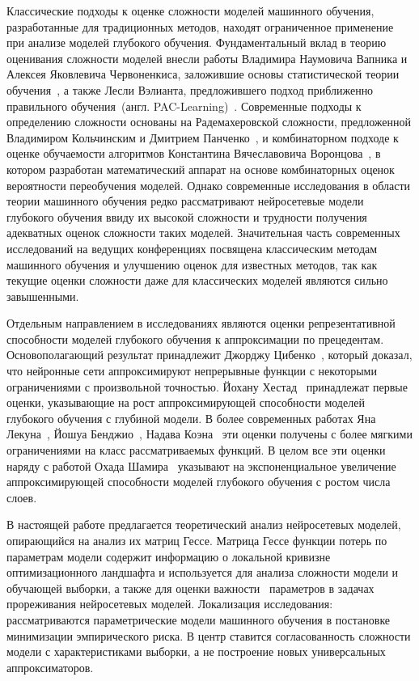 Классические подходы к оценке сложности моделей машинного обучения, разработанные для традиционных методов, находят ограниченное применение при анализе моделей глубокого обучения.
Фундаментальный вклад в теорию оценивания сложности моделей внесли работы Владимира Наумовича Вапника и Алексея Яковлевича Червоненкиса, заложившие основы статистической теории обучения~\cite{vapnik1974StatTheory}, а также Лесли Вэлианта, предложившего подход приближенно правильного обучения~(англ. PAC-Learning)~\cite{valiant1984LearnableTheory}.
Современные подходы к определению сложности основаны на Радемахеровской сложности, предложенной Владимиром Кольчинским и Дмитрием Панченко~\cite{koltchinskii2000RadamakherTheory}, и комбинаторном подходе к оценке обучаемости алгоритмов Константина Вячеславовича Воронцова~\cite{vorontsov04qualdan}, в котором разработан математический аппарат на основе комбинаторных оценок вероятности переобучения моделей.
Однако современные исследования в области теории машинного обучения редко рассматривают нейросетевые модели глубокого обучения ввиду их высокой сложности и трудности получения адекватных оценок сложности таких моделей.
Значительная часть современных исследований на ведущих конференциях посвящена классическим методам машинного обучения и улучшению оценок для известных методов, так как текущие оценки сложности даже для классических моделей являются сильно завышенными.

Отдельным направлением в исследованиях являются оценки репрезентативной способности моделей глубокого обучения к аппроксимации по прецедентам.
Основополагающий результат принадлежит Джорджу Цибенко~\cite{cybenko1989ApproximationBS}, который доказал, что нейронные сети аппроксимируют непрерывные функции с некоторыми ограничениями с произвольной точностью.
Йохану Хестад~\cite{hastad1987phd} принадлежат первые оценки, указывающие на рост аппроксимирующей способности моделей глубокого обучения с глубиной модели.
В более современных работах Яна Лекуна~\cite{bengioLecun2007:scaling}, Йошуа Бенджио~\cite{begio2011exponetialdepth}, Надава Коэна~\cite{cohen2015OnTE} эти оценки получены с более мягкими ограничениями на класс рассматриваемых функций.
В целом все эти оценки наряду с работой Охада Шамира~\cite{eldan2016exponentialcomplexity} указывают на экспоненциальное увеличение аппроксимирующей способности моделей глубокого обучения с ростом числа слоев.

В настоящей работе предлагается теоретический анализ нейросетевых моделей, опирающийся на анализ их матриц Гессе.
Матрица Гессе функции потерь по параметрам модели содержит информацию о локальной кривизне оптимизационного ландшафта и используется для анализа сложности модели и обучающей выборки, а также для оценки важности~\cite{bakhteev2020ordering609999528, bakhteev2019estimation609999169} параметров в задачах прореживания нейросетевых моделей.
Локализация исследования: рассматриваются параметрические модели машинного обучения в постановке минимизации эмпирического риска. В центр ставится согласованность сложности модели с характеристиками выборки, а не построение новых универсальных аппроксиматоров.

